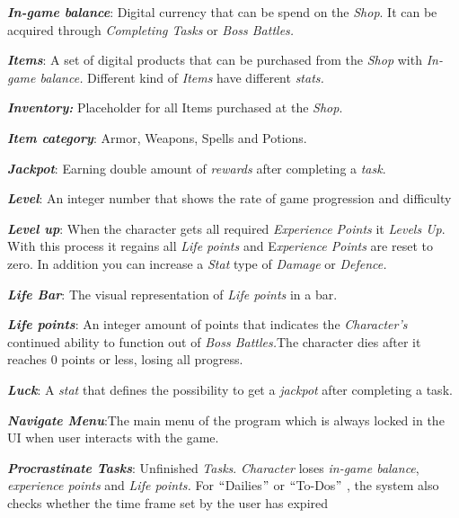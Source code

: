 \documentclass[12pt]{report}
\renewcommand{\_}{\kern-1.5pt\textunderscore\kern-1.5pt}
\begin{document}
\textbf{\textit{In-game balance}}: Digital currency that can be spend on the \textit{Shop}. It can be acquired through \textit{Completing Tasks} or \textit{Boss Battles.}\par

\textbf{\textit{Items}}: A set of digital products that can be purchased from the \textit{Shop} with \textit{In-game balance. }Different kind of \textit{Items} have different \textit{stats.}\par

\textbf{\textit{Inventory: }}Placeholder for all Items purchased at the \textit{Shop}. \par

\textbf{\textit{Item category}}: Armor, Weapons, Spells and Potions.\par

\textbf{\textit{Jackpot}}: Earning double amount of \textit{rewards }after completing a \textit{task}.\par

\textbf{\textit{Level}}: An integer number that shows the rate of game progression and difficulty\par

\textbf{\textit{Level up}}: When the character gets all required \textit{Experience Points} it \textit{Levels Up}. With this process it regains all\textit{ Life points }and E\textit{xperience Points} are reset to zero. In addition you can increase a \textit{Stat} type of \textit{Damage} or \textit{Defence.}\par

\textbf{\textit{Life Bar}}: The visual representation of \textit{Life points }in a bar. \par

\textbf{\textit{Life points}}: An integer amount of points \textcolor[HTML]{222222}{that indicates the \textit{Character’s} continued ability to function out of\textit{ Boss Battles.}}The character dies after it reaches 0 points or less, losing all progress.\par

\textbf{\textit{Luck}}: A \textit{stat }that defines the possibility to get a \textit{jackpot} after completing a task.\par

\textbf{\textit{Navigate Menu}}:The main menu of the program which is always locked in the UI when user interacts with the game.\par

\textbf{\textit{Procrastinate Tasks}}: Unfinished \textit{Tasks}. \textit{Character} loses \textit{in-game balance}, \textit{experience points} and \textit{Life points.} For $``$Dailies$"$  or $``$To-Dos$"$ , the system also checks whether the time frame set by the user has expired \par
\end{document}
